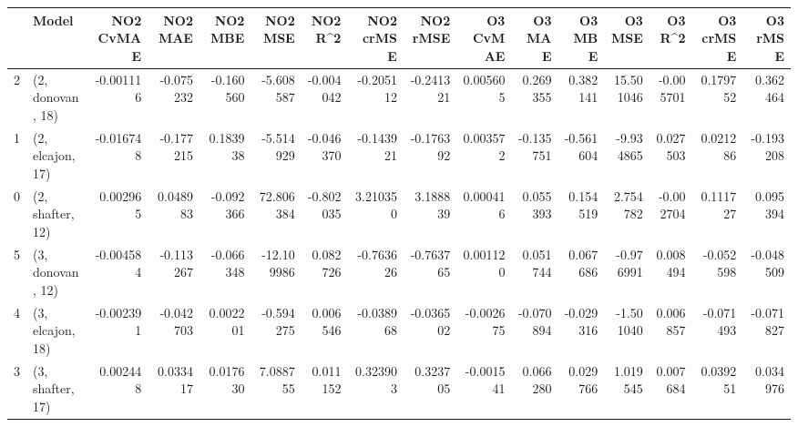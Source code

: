 \begin{tabular}{llrrrrrrrrrrrrrr}
\toprule
{} &             Model &  NO2 CvMAE &   NO2 MAE &   NO2 MBE &    NO2 MSE &   NO2 R\textasciicircum2 &  NO2 crMSE &  NO2 rMSE &  O3 CvMAE &    O3 MAE &    O3 MBE &     O3 MSE &    O3 R\textasciicircum2 &  O3 crMSE &   O3 rMSE \\
\midrule
2 &  (2, donovan, 18) &  -0.001116 & -0.075232 & -0.160560 &  -5.608587 & -0.004042 &  -0.205112 & -0.241321 &  0.005605 &  0.269355 &  0.382141 &  15.501046 & -0.005701 &  0.179752 &  0.362464 \\
1 &  (2, elcajon, 17) &  -0.016748 & -0.177215 &  0.183938 &  -5.514929 & -0.046370 &  -0.143921 & -0.176392 &  0.003572 & -0.135751 & -0.561604 &  -9.934865 &  0.027503 &  0.021286 & -0.193208 \\
0 &  (2, shafter, 12) &   0.002965 &  0.048983 & -0.092366 &  72.806384 & -0.802035 &   3.210350 &  3.188839 &  0.000416 &  0.055393 &  0.154519 &   2.754782 & -0.002704 &  0.111727 &  0.095394 \\
5 &  (3, donovan, 12) &  -0.004584 & -0.113267 & -0.066348 & -12.109986 &  0.082726 &  -0.763626 & -0.763765 &  0.001120 &  0.051744 &  0.067686 &  -0.976991 &  0.008494 & -0.052598 & -0.048509 \\
4 &  (3, elcajon, 18) &  -0.002391 & -0.042703 &  0.002201 &  -0.594275 &  0.006546 &  -0.038968 & -0.036502 & -0.002675 & -0.070894 & -0.029316 &  -1.501040 &  0.006857 & -0.071493 & -0.071827 \\
3 &  (3, shafter, 17) &   0.002448 &  0.033417 &  0.017630 &   7.088755 &  0.011152 &   0.323903 &  0.323705 & -0.001541 &  0.066280 &  0.029766 &   1.019545 &  0.007684 &  0.039251 &  0.034976 \\
\bottomrule
\end{tabular}
